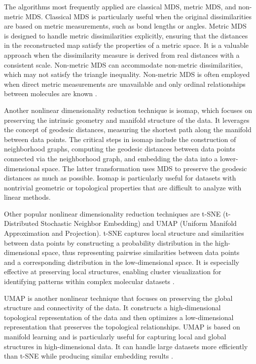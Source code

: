 \documentclass[9pt,bestpractices]{livecoms}
\begin{document}
The algorithms most frequently applied are classical MDS, metric MDS, and non-metric MDS. Classical MDS is particularly useful when the original dissimilarities are based on metric measurements, such as bond lengths or angles. Metric MDS is designed to handle metric dissimilarities explicitly, ensuring that the distances in the reconstructed map satisfy the properties of a metric space. It is a valuable approach when the dissimilarity measure is derived from real distances with a consistent scale. Non-metric MDS can accommodate non-metric dissimilarities, which may not satisfy the triangle inequality. Non-metric MDS is often employed when direct metric measurements are unavailable and only ordinal relationships between molecules are known \cite{RN14}.

Another nonlinear dimensionality reduction technique is isomap, which focuses on preserving the intrinsic geometry and manifold structure of the data. It leverages the concept of geodesic distances, measuring the shortest path along the manifold between data points. The critical steps in isomap include the construction of neighborhood graphs, computing the geodesic distances between data points connected via the neighborhood graph, and embedding the data into a lower-dimensional space. The latter transformation uses MDS to preserve the geodesic distances as much as possible. Isomap is particularly useful for datasets with nontrivial geometric or topological properties that are difficult to analyze with linear methods.\cite{RN94, RN12}

Other popular nonlinear dimensionality reduction techniques are t-SNE (t-Distributed Stochastic Neighbor Embedding) and UMAP (Uniform Manifold Approximation and Projection).  t-SNE captures local structure and similarities between data points by constructing a probability distribution in the high-dimensional space, thus representing pairwise similarities between data points and a corresponding distribution in the low-dimensional space. It is especially effective at preserving local structures, enabling cluster visualization for identifying patterns within complex molecular datasets \cite{RN10}.

UMAP is another nonlinear technique that focuses on preserving the global structure and connectivity of the data. It constructs a high-dimensional topological representation of the data and then optimizes a low-dimensional representation that preserves the topological relationships. UMAP is based on manifold learning and is particularly useful for capturing local and global structures in high-dimensional data. It can handle large datasets more efficiently than t-SNE while producing similar embedding results \cite{RN20}.
\end{document}
